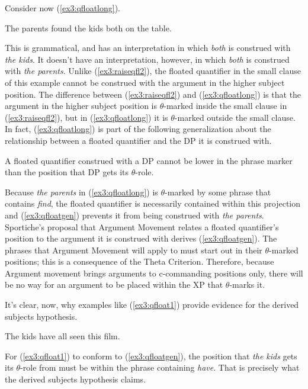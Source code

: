 Consider now (\ref{ex3:qfloatlong}).
\begin{exe}
\ex \label{ex3:qfloatlong} The parents found the kids both on the table.
\end{exe}
This is grammatical, and has an interpretation in which \emph{both} is construed with \emph{the kids}. It doesn't have an interpretation, however, in which \emph{both} is construed with \emph{the parents}. Unlike (\ref{ex3:raiseqfl2}), the floated quantifier in the small clause of this example cannot be construed with the argument in the higher subject position. The difference between (\ref{ex3:raiseqfl2}) and (\ref{ex3:qfloatlong}) is that the argument in the higher subject position is \mbox{$\theta$-marked} inside the small clause in (\ref{ex3:raiseqfl2}), but in (\ref{ex3:qfloatlong}) it is \mbox{$\theta$-marked} outside the small clause. In fact, (\ref{ex3:qfloatlong}) is part of the following generalization about the relationship between a floated quantifier and the DP it is construed with.
\begin{exe}
\ex \label{ex3:qfloatgen} A floated quantifier construed with a DP cannot be lower in the phrase marker than the position that DP gets its $\theta$-role.
\end{exe}
Because \emph{the parents} in (\ref{ex3:qfloatlong}) is \mbox{$\theta$-marked} by some phrase that contains \emph{find}, the floated quantifier is necessarily contained within this projection and (\ref{ex3:qfloatgen}) prevents it from being construed with \emph{the parents}.  Sportiche's proposal that Argument Movement relates a floated quantifier's position to the argument it is construed with derives (\ref{ex3:qfloatgen}). The phrases that Argument Movement will apply to must start out in their \mbox{$\theta$-marked} positions; this is a consequence of the Theta Criterion. Therefore, because Argument movement brings arguments to c-commanding positions only, there will be no way for an argument to be placed within the XP that \mbox{$\theta$-marks} it. 

It's clear, now, why examples like (\ref{ex3:qfloat1}) provide evidence for the derived subjects hypothesis.
\begin{exe}
 The kids have all seen this film.
\end{exe}
For (\ref{ex3:qfloat1}) to conform to (\ref{ex3:qfloatgen}), the position that \emph{the kids} gets its \mbox{$\theta$-role} from must be within the phrase containing \emph{have}. That is precisely what the derived subjects hypothesis claims.

